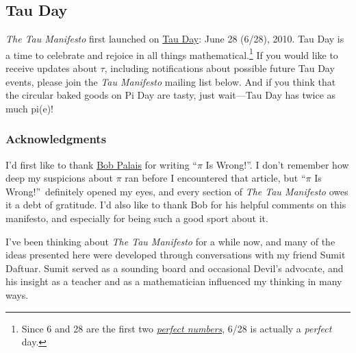 {%


  \subsection{Tau Day} %
  \label{sec:tau_day}

\emph{The Tau Manifesto} first launched on \href{https://tauday.com/}{Tau Day}: June 28 (6/28), 2010. Tau Day is a time to celebrate and rejoice in all things mathematical.\footnote{Since 6 and 28 are the first two \href{https://en.wikipedia.org/wiki/Perfect_number}{\emph{perfect numbers}}, 6/28 is actually a \emph{perfect} day.} If you would like to receive updates about $\tau$, including notifications about possible future Tau Day events, please join the \emph{Tau Manifesto} mailing list below. And if you think that the circular baked goods on Pi Day are tasty, just wait---Tau Day has twice as much pi(e)!


  \subsubsection{Acknowledgments} %
  \label{sec:acknowledgments}

I'd first like to thank \href{https://www.math.utah.edu/~palais}{Bob Palais} for writing ``$\pi$ Is Wrong!''. I don't remember how deep my suspicions about $\pi$ ran before I encountered that article, but ``$\pi$ Is Wrong!''\ definitely opened my eyes, and every section of \emph{The Tau Manifesto} owes it a debt of gratitude. I'd also like to thank Bob for his helpful comments on this manifesto, and especially for being such a good sport about it.

I've been thinking about \emph{The Tau Manifesto} for a while now, and many of the ideas presented here were developed through conversations with my friend Sumit Daftuar. Sumit served as a sounding board and occasional Devil's advocate, and his insight as a teacher and as a mathematician influenced my thinking in many ways.

}
